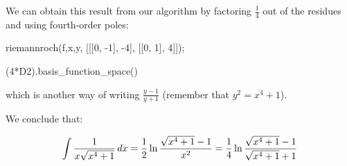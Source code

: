 We can obtain this result from our algorithm by factoring $\frac{1}{4}$ out
of the residues and using fourth-order poles:

\begin{maximablock}
riemannroch(f,x,y,
    [[[0, -1], -4], [[0, 1], 4]]);
\end{maximablock}

\begin{sageblock}[geddes]
(4*D2).basis_function_space()
\end{sageblock}

which is another way of writing $\frac{y-1}{y+1}$ (remember
that $y^2 = x^4+1$).

We conclude that:

$$\int {1\over{x\sqrt{x^4+1}}} \, dx
={1\over2} \ln {{\sqrt{x^4+1}-1}\over{x^2}}
={1\over4} \ln {{\sqrt{x^4+1}-1}\over{\sqrt{x^4+1}+1}}$$

\endexample

